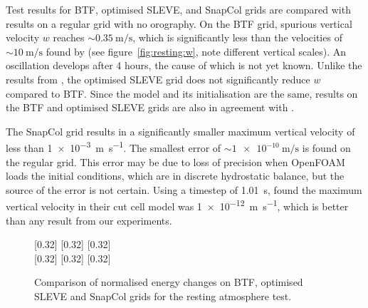Test results for BTF, optimised SLEVE, and SnapCol grids are compared with results on a regular grid with no orography.  On the BTF grid, spurious vertical velocity $w$ reaches $\sim \SI{0.35}{\meter\per\second}$, which is significantly less than the velocities of $\sim \SI{10}{\meter\per\second}$ found by \textcite{klemp2011} (see figure~\ref{fig:resting:w}, note different vertical scales).  An oscillation develops after 4 hours, the cause of which is not yet known.  Unlike the results from \textcite{klemp2011}, the optimised SLEVE grid does not significantly reduce $w$ compared to BTF.  Since the model and its initialisation are the same, results on the BTF and optimised SLEVE grids are also in agreement with \textcite{weller-shahrokhi2014}.

The SnapCol grid results in a significantly smaller maximum vertical velocity of less than \SI{1e-3}{\meter\per\second}.  The smallest error of $\sim \SI{1e-10}{\meter\per\second}$ is found on the regular grid.  This error may be due to loss of precision when OpenFOAM loads the initial conditions, which are in discrete hydrostatic balance, but the source of the error is not certain.  Using a timestep of \SI{1.01}{\second}, \textcite{good2013} found the maximum vertical velocity in their cut cell model was \SI{1e-12}{\meter\per\second}, which is better than any result from our experiments. 

\begin{figure}
	\captionsetup[subfigure]{position=b}
	\centering
	[0.32\textwidth]{}
	\hfill
	[0.32\textwidth]{}
	\hfill
	[0.32\textwidth]{}
	\\
	[0.32\textwidth]{}
	\hfill
	[0.32\textwidth]{}
	\hfill
	[0.32\textwidth]{}
	\caption{Comparison of normalised energy changes on BTF, optimised SLEVE and SnapCol grids for the resting atmosphere test.}
	\label{fig:resting:energy}
\end{figure}

